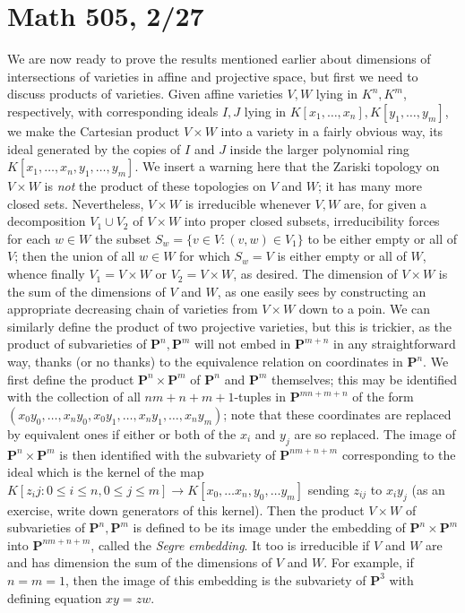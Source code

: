 \documentclass[10pt]{article}
\begin{document}
\section*{Math 505, 2/27}

We are now ready to prove the results mentioned earlier about dimensions
of intersections of varieties in affine and projective space, but first
we need to discuss products of varieties. Given affine varieties $V,W$
lying in $K^n,K^m$, respectively, with corresponding ideals $I,J$ lying
in $K[x_1,\ldots,x_n],K[y_1,\ldots,y_m]$, we make the Cartesian product
$V\times W$ into a variety in a fairly obvious way, its ideal generated
by the copies of $I$ and $J$ inside the larger polynomial ring
$K[x_1,\ldots,x_n,y_1,\ldots,y_m]$. We insert a warning here that the
Zariski topology on $V\times W$ is {\sl not} the product of these
topologies on $V$ and $W$; it has many more closed sets. Nevertheless,
$V\times W$ is irreducible whenever $V,W$ are, for given a decomposition
$V_1\cup V_2$ of $V\times W$ into proper closed subsets, irreducibility
forces for each $w\in W$ the subset $S_w = \{v\in V: (v,w)\in V_1\}$ to
be either empty or all of $V$; then the union of all $w\in W$ for which
$S_w = V$ is either empty or all of $W$, whence finally $V_1 = V\times
W$ or $V_2 = V\times W$, as desired. The dimension of $V\times W$ is the
sum of the dimensions of $V$ and $W$, as one easily sees by constructing
an appropriate decreasing chain of varieties from $V\times W$ down to a
poin. We can similarly define the product of two projective varieties,
but this is trickier, as the product of subvarieties of $\mathbf
P^n,\mathbf P^m$ will not embed in $\mathbf P^{m+n}$ in any
straightforward way, thanks (or no thanks) to the equivalence relation
on coordinates in $\mathbf P^n$. We first define the product $\mathbf
P^n\times\mathbf P^m$ of $\mathbf P^n$ and $\mathbf P^m$ themselves;
this may be identified with the collection of all $nm+n+m+1$-tuples in
$\mathbf P^{mn+m+n}$ of the form
$(x_0y_0,\ldots,x_ny_0,x_0y_1,\ldots,x_ny_1,\ldots,x_ny_m)$; note that
these coordinates are replaced by equivalent ones if either or both of
the $x_i$ and $y_j$ are so replaced. The image of $\mathbf P^n\times
\mathbf P^m$ is then identified with the subvariety of $\mathbf
P^{nm+n+m}$ corresponding to the ideal which is the kernel of the map
$K[z_ij:0\le i\le n,0\le j\le m]\rightarrow K[x_0,\ldots x_n,y_0,\ldots
  y_m]$ sending $z_{ij}$ to $x_i y_j$ (as an exercise, write down
generators of this kernel). Then the product $V\times W$ of subvarieties
of $\mathbf P^n,\mathbf P^m$ is defined to be its image under the
embedding of $\mathbf P^n\times \mathbf P^m$ into $\mathbf P^{nm+n+m}$,
called the {\sl Segre embedding}. It too is irreducible if $V$ and $W$
are and has dimension the sum of the dimensions of $V$ and $W$. For
example, if $n=m=1$, then the image of this embedding is the subvariety
of $\mathbf P^3$ with defining equation $xy = zw$.
\end{document}
